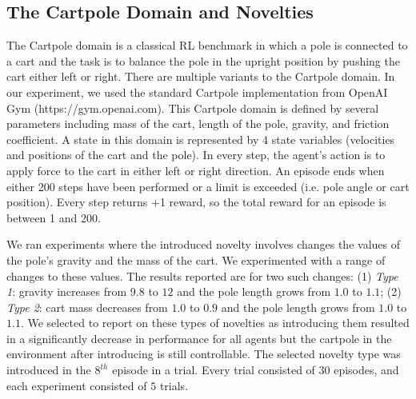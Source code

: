 \documentclass{article}
\begin{document}
\subsection{The Cartpole Domain and Novelties}

The Cartpole domain is a classical RL benchmark in which a pole is connected to a cart and the task is to balance the pole in the upright position by pushing the cart either left or right. 
There are multiple variants to the Cartpole domain. 
In our experiment, we used the standard Cartpole implementation 
from OpenAI Gym (https://gym.openai.com). 
This Cartpole domain is defined by several parameters including mass of the cart, length of the pole, gravity, and friction coefficient. 
A state in this domain is represented by 4 state variables (velocities and positions of the cart and the pole).
In every step, the agent's action is to apply force to the cart in either left or right direction. 
An episode ends when either 200 steps have been performed or a limit is exceeded (i.e. pole angle or cart position). %
Every step returns +1 reward, so the total reward for an episode is between 1 and 200. 


We ran experiments where the introduced novelty involves changes the values of the pole's gravity and the mass of the cart. We experimented with a range of changes to these values. The results reported are for two such changes: 
(1) \emph{Type 1}: gravity increases from $9.8$ to $12$ and the pole length grows from $1.0$ to $1.1$;
(2) \emph{Type 2}: cart mass decreases from $1.0$ to $0.9$ and the pole length grows from $1.0$ to $1.1$. 
We selected to report on these types of novelties as introducing them resulted in a significantly decrease in performance for all agents but the cartpole in the environment after introducing is still controllable.  
The selected novelty type was introduced in the $8^{th}$ episode in a trial. 
Every trial consisted of $30$ episodes, and each experiment consisted of $5$ trials.



\end{document}
